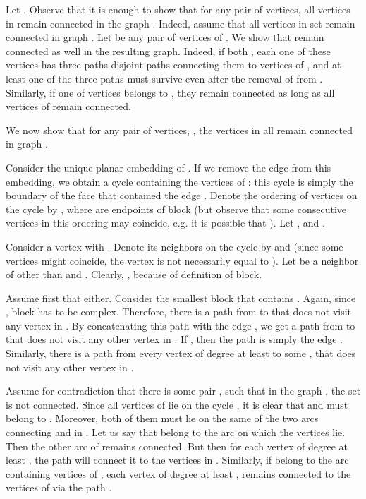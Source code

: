\documentclass[twoside,leqno,twocolumn]{article}
\begin{document}
Let .
Observe that it is enough to show that for any pair  of vertices, all vertices in  remain connected in the graph . Indeed, assume that all vertices in set  remain connected in graph . Let  be any pair of vertices of . We show that  remain connected as well in the resulting graph. Indeed, if both , each one of these vertices has three paths disjoint paths connecting them to vertices of , and at least one of the three paths must survive even after the removal of  from . Similarly, if one of vertices  belongs to , they remain connected as long as all vertices of  remain connected.

We now show that for any pair  of vertices, , the vertices in  all remain connected in graph .

Consider the unique planar embedding of . If we remove the edge  from this embedding, we obtain a cycle  containing the vertices of : this cycle is simply the boundary of the face that contained the edge .
Denote the ordering of vertices on the cycle by , where  are endpoints of block  (but observe that some consecutive vertices in this ordering may coincide, e.g. it is possible that ).
Let , and .

Consider a vertex  with . Denote its neighbors on the cycle
by  and  (since some vertices  might coincide, the vertex
 is not necessarily equal to ).
Let  be a neighbor of  other than  and . Clearly,
, because of definition of block. 

Assume first that  either.
Consider the smallest block  that contains .
Again, since , block  has to be complex. Therefore, there is a path from  to  that 
does not visit any vertex in . By concatenating this path with the edge , 
we get a path  from  to   that does not visit any other vertex in . If , then the path  is simply the edge .
Similarly, there is a path  from every vertex  of degree at least  
to some , that does not visit any other vertex in . 

Assume for contradiction that there is some pair , such that in the graph , the set  is not connected. Since all vertices of  lie on the cycle , it is clear that  and  must belong to .
Moreover, both of them must lie on the same of the two arcs connecting  and  in .
Let us say that  belong to the arc on which the vertices  lie.
Then the other arc of  remains connected. But then for each vertex  of degree at least , the path  will connect it to the vertices in . Similarly, if  belong to the arc containing vertices of , each vertex  of degree at least , remains connected to the vertices of  via the path .
 
\end{document}
